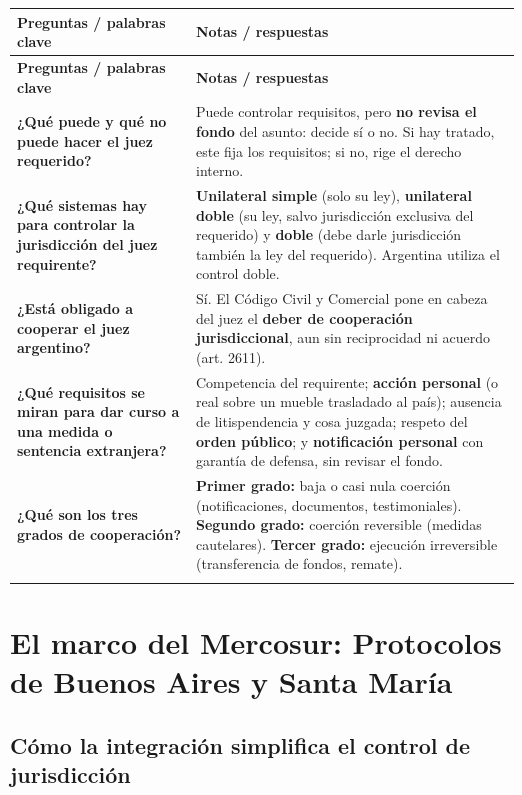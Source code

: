 \documentclass[12pt,oneside]{book}
\makeatletter
\newenvironment{cornell}{%
    \begin{longtable}{@{}>{\raggedright\arraybackslash}p{0.28\textwidth}>{\raggedright\arraybackslash}p{0.67\textwidth}@{}}
    \toprule
    \textbf{Preguntas / palabras clave} & \textbf{Notas / respuestas} \\
    \midrule
    \endfirsthead
    \toprule
    \textbf{Preguntas / palabras clave} & \textbf{Notas / respuestas} \\
    \midrule
    \endhead
}{%
    \end{longtable}
}
\newcommand{\cornellrow}[2]{\textbf{#1} & #2 \\[0.6em]}
\newcommand{\cornellresumen}[1]{%
    \midrule
    \multicolumn{2}{@{}p{\dimexpr0.95\textwidth+2\tabcolsep\relax}@{}}{\textbf{Resumen:} #1} \\
    \bottomrule
}
\makeatother
\begin{document}
\begin{cornell}
\cornellrow{¿Qué puede y qué no puede hacer el juez requerido?}{Puede controlar requisitos, pero \textbf{no revisa el fondo} del asunto: decide sí o no. Si hay tratado, este fija los requisitos; si no, rige el derecho interno.}
\cornellrow{¿Qué sistemas hay para controlar la jurisdicción del juez requirente?}{\textbf{Unilateral simple} (solo su ley), \textbf{unilateral doble} (su ley, salvo jurisdicción exclusiva del requerido) y \textbf{doble} (debe darle jurisdicción también la ley del requerido). Argentina utiliza el control doble.}
\cornellrow{¿Está obligado a cooperar el juez argentino?}{Sí. El Código Civil y Comercial pone en cabeza del juez el \textbf{deber de cooperación jurisdiccional}, aun sin reciprocidad ni acuerdo (art. 2611).}
\cornellrow{¿Qué requisitos se miran para dar curso a una medida o sentencia extranjera?}{Competencia del requirente; \textbf{acción personal} (o real sobre un mueble trasladado al país); ausencia de litispendencia y cosa juzgada; respeto del \textbf{orden público}; y \textbf{notificación personal} con garantía de defensa, sin revisar el fondo.}
\cornellrow{¿Qué son los tres grados de cooperación?}{\textbf{Primer grado:} baja o casi nula coerción (notificaciones, documentos, testimoniales). \textbf{Segundo grado:} coerción reversible (medidas cautelares). \textbf{Tercer grado:} ejecución irreversible (transferencia de fondos, remate).}
\cornellresumen{El juez requerido no revisa el fondo, pero controla la competencia del requirente según distintos sistemas (Argentina aplica el control doble), el tipo de acción, la ausencia de litispendencia y cosa juzgada, el orden público y la notificación personal, que es una cuestión de orden público procesal. El Código Civil y Comercial impone un deber de cooperación. La cooperación se clasifica en tres grados según la intensidad y reversibilidad de la coerción.}
\end{cornell}

\chapter[El marco del Mercosur: Buenos Aires y Santa María]{El marco del Mercosur: Protocolos de Buenos Aires y Santa María}

\section{Cómo la integración simplifica el control de jurisdicción}
\end{document}
